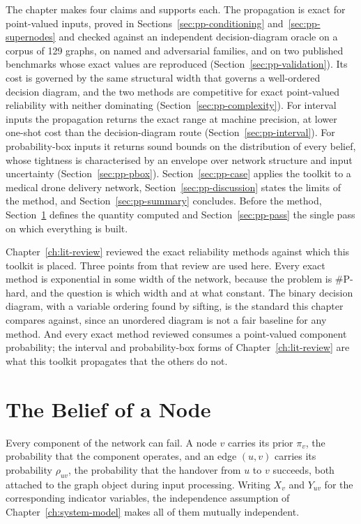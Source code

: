 \documentclass[12pt]{report}
\begin{document}
The chapter makes four claims and supports each. The propagation is exact for point-valued
inputs, proved in Sections~\ref{sec:pp-conditioning} and~\ref{sec:pp-supernodes} and checked
against an independent decision-diagram oracle on a corpus of 129 graphs, on named and
adversarial families, and on two published benchmarks whose exact values are reproduced
(Section~\ref{sec:pp-validation}). Its cost is governed by the same structural width that
governs a well-ordered decision diagram, and the two methods are competitive for exact
point-valued reliability with neither dominating (Section~\ref{sec:pp-complexity}). For
interval inputs the propagation returns the exact range at machine precision, at lower
one-shot cost than the decision-diagram route (Section~\ref{sec:pp-interval}). For
probability-box inputs it returns sound bounds on the distribution of every belief, whose
tightness is characterised by an envelope over network structure and input uncertainty
(Section~\ref{sec:pp-pbox}). Section~\ref{sec:pp-case} applies the toolkit to a medical drone
delivery network, Section~\ref{sec:pp-discussion} states the limits of the method, and
Section~\ref{sec:pp-summary} concludes. Before the method, Section~\ref{sec:pp-belief}
defines the quantity computed and Section~\ref{sec:pp-pass} the single pass on which
everything is built.

Chapter~\ref{ch:lit-review} reviewed the exact reliability methods against which this
toolkit is placed. Three points from that review are used here. Every exact method is
exponential in some width of the network, because the problem is \#P-hard, and the
question is which width and at what constant. The binary decision diagram, with a variable
ordering found by sifting, is the standard this chapter compares against, since an unordered
diagram is not a fair baseline for any method. And every exact method reviewed consumes a
point-valued component probability; the interval and probability-box forms of
Chapter~\ref{ch:lit-review} are what this toolkit propagates that the others do not.

\section{The Belief of a Node}
\label{sec:pp-belief}

Every component of the network can fail. A node $v$ carries its prior $\pi_v$, the probability that the component operates, and an edge $(u,v)$ carries its probability $\rho_{uv}$, the probability that the handover from $u$ to $v$ succeeds, both attached to the graph object during input processing. Writing $X_v$ and $Y_{uv}$ for the corresponding indicator variables, the independence assumption of Chapter~\ref{ch:system-model} makes all of them mutually independent.
\end{document}
